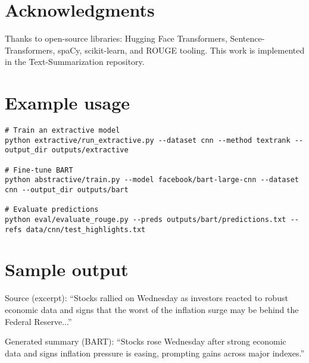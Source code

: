 \documentclass[11pt,a4paper]{article}
\begin{document}
\section*{Acknowledgments}
Thanks to open-source libraries: Hugging Face Transformers, Sentence-Transformers, spaCy, scikit-learn, and ROUGE tooling. This work is implemented in the Text-Summarization repository.

\appendix
\section{Example usage}
\begin{verbatim}
# Train an extractive model
python extractive/run_extractive.py --dataset cnn --method textrank --output_dir outputs/extractive

# Fine-tune BART
python abstractive/train.py --model facebook/bart-large-cnn --dataset cnn --output_dir outputs/bart

# Evaluate predictions
python eval/evaluate_rouge.py --preds outputs/bart/predictions.txt --refs data/cnn/test_highlights.txt
\end{verbatim}

\section{Sample output}
Source (excerpt): ``Stocks rallied on Wednesday as investors reacted to robust economic data and signs that the worst of the inflation surge may be behind the Federal Reserve...''

Generated summary (BART): ``Stocks rose Wednesday after strong economic data and signs inflation pressure is easing, prompting gains across major indexes.''



\end{document}
